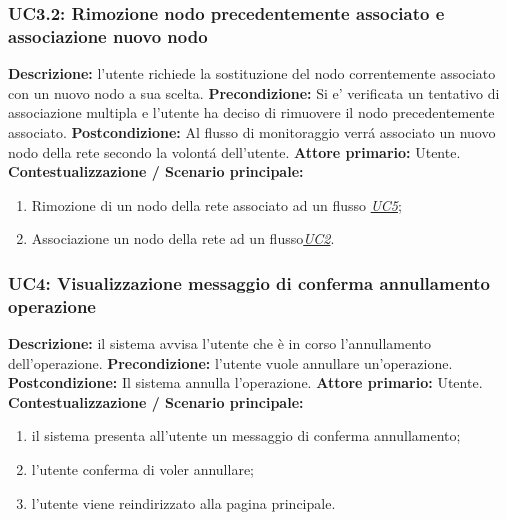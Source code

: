                 \subsubsection{UC3.2: Rimozione nodo precedentemente associato e associazione nuovo nodo}
                    \textbf{Descrizione:} l’utente richiede la sostituzione del nodo correntemente associato con un nuovo nodo a sua scelta.
                    \newline
                    \textbf{Precondizione:}  Si e’ verificata un tentativo di associazione multipla e l’utente ha deciso di rimuovere il nodo precedentemente associato.
                    \newline
                    \textbf{Postcondizione:} Al flusso di monitoraggio verrá associato un nuovo nodo della rete secondo la volontá dell’utente.
                    \newline
                    \textbf{Attore primario:} Utente.
                    \newline
                    \textbf{Contestualizzazione / Scenario principale:} \begin{enumerate}
                        \item Rimozione di un nodo della rete associato ad un flusso \underline{\textit{UC5}};
                        \item Associazione un nodo della rete ad un flusso\underline{\textit{UC2}}.
                    \end{enumerate}
                    
                \subsubsection{UC4: Visualizzazione messaggio di conferma annullamento operazione}
                    \textbf{Descrizione:} il sistema avvisa l’utente che è in corso l’annullamento dell’operazione.
                    \newline
                    \textbf{Precondizione:} l’utente vuole annullare un’operazione.
                    \newline
                    \textbf{Postcondizione:} Il sistema annulla l’operazione.
                    \newline
                    \textbf{Attore primario:} Utente.
                    \newline
                    \textbf{Contestualizzazione / Scenario principale:} \begin{enumerate}
                        \item il sistema presenta all’utente un messaggio di conferma annullamento;
                        \item l’utente conferma di voler annullare; 
                        \item l’utente viene reindirizzato alla pagina principale.
                    \end{enumerate}
                    
